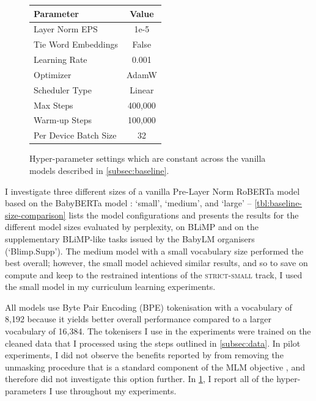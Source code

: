 \begin{figure}
    \centering
    \small
    \begin{tabular}{lc}
    \toprule
         Parameter& Value\\
    \midrule
         Layer Norm EPS& 1e-5 \\
         Tie Word Embeddings & False \\
         Learning Rate & 0.001 \\
         Optimizer & AdamW \\
         Scheduler Type & Linear\\
         Max Steps & 400,000 \\
         Warm-up Steps & 100,000\\
         Per Device Batch Size & 32 \\
    \bottomrule
    \end{tabular}
    \caption{Hyper-parameter settings which are constant across the vanilla models described in \cref{subsec:baseline}.}
    \label{tbl:baseline_hyperparams}
\end{figure}

I investigate three different sizes of a vanilla Pre-Layer Norm RoBERTa model \citep{liu2019roberta} based on the BabyBERTa model \citep{huebner2021babyberta}: `small', `medium', and `large' -- \cref{tbl:baseline-size-comparison} lists the model configurations and presents the results for the different model sizes evaluated by perplexity, on BLiMP \citep{warstadt2020blimp} and on the supplementary BLiMP-like tasks issued by the BabyLM organisers (`Blimp.Supp'). The medium model with a small vocabulary size performed the best overall; however, the small model achieved similar results, and so to save on compute and keep to the restrained intentions of the \textsc{strict-small} track, I used the small model in my curriculum learning experiments.

All models use Byte Pair Encoding (BPE) tokenisation \citep{gage1994bpe} with a vocabulary of 8,192 because it yields better overall performance compared to a larger vocabulary of 16,384. The tokenisers I use in the experiments were trained on the cleaned data that I processed using the steps outlined in \cref{subsec:data}. In pilot experiments, I did not observe the benefits reported by \citet{huebner2021babyberta} from removing the unmasking procedure that is a standard component of the MLM objective \citep{devlin2019bert}, and therefore did not investigate this option further. In \cref{tbl:baseline_hyperparams}, I report all of the hyper-parameters I use throughout my experiments.

